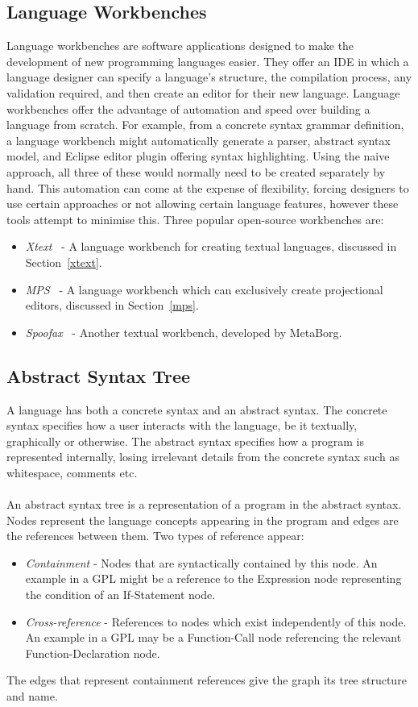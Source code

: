 \documentclass{article}
\begin{document}
\subsection{Language Workbenches}
Language workbenches are software applications designed to make the development of new programming languages easier. They offer an IDE in which a language designer can specify a language's structure, the compilation process, any validation required, and then create an editor for their new language. Language workbenches offer the advantage of automation and speed over building a language from scratch. For example, from a concrete syntax grammar definition, a language workbench might automatically generate a parser, abstract syntax model, and Eclipse editor plugin offering syntax highlighting. Using the naive approach, all three of these would normally need to be created separately by hand. This automation can come at the expense of flexibility, forcing designers to use certain approaches or not allowing certain language features, however these tools attempt to minimise this. Three popular open-source workbenches are:
\begin{itemize}
\item \emph{Xtext}~\cite{xtext} - A language workbench for creating textual languages, discussed in Section~\ref{xtext}.
\item \emph{MPS}~\cite{mps} - A language workbench which can exclusively create projectional editors, discussed in Section~\ref{mps}.
\item \emph{Spoofax}~\cite{spoofax} - Another textual workbench, developed by MetaBorg. 
\end{itemize}
%
\subsection{Abstract Syntax Tree}
A language has both a concrete syntax and an abstract syntax. The concrete syntax specifies how a user interacts with the language, be it textually, graphically or otherwise. The abstract syntax specifies how a program is represented internally, losing irrelevant details from the concrete syntax such as whitespace, comments etc.
\\
\\
An abstract syntax tree is a representation of a program in the abstract syntax. Nodes represent the language concepts appearing in the program and edges are the references between them. Two types of reference appear:
\begin{itemize}
\item \emph{Containment} - Nodes that are syntactically contained by this node. An example in a GPL might be a reference to the Expression node representing the condition of an If-Statement node.
\item \emph{Cross-reference} - References to nodes which exist independently of this node. An example in a GPL may be a Function-Call node referencing the relevant Function-Declaration node. 
\end{itemize}
The edges that represent containment references give the graph its tree structure and name.
\end{document}
